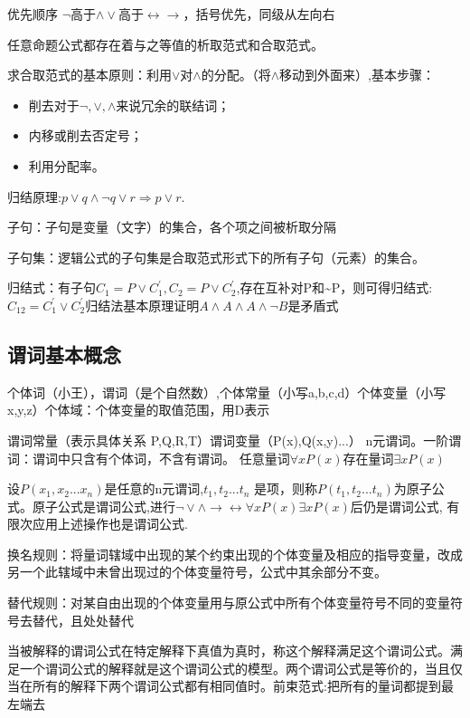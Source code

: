\documentclass[UTF8,a4paper,landscape,16pt]{paper}
\begin{document}
\begin{multicols}{4}
优先顺序 $\lnot$高于$\land\lor$高于$\leftrightarrow\rightarrow$，括号优先，同级从左向右

\noindent 任意命题公式都存在着与之等值的析取范式和合取范式。

\noindent 求合取范式的基本原则：利用$\lor$对$\land$的分配。（将$\land$移动到外面来）,基本步骤：
\begin{itemize}
\item 削去对于$\lnot,\lor,\land$来说冗余的联结词；
\item 内移或削去否定号；
\item 利用分配率。
\end{itemize}

\noindent 归结原理:$p \lor q\land\lnot q \lor r\Rightarrow p \lor r$.

\noindent 子句：子句是变量（文字）的集合，各个项之间被析取分隔

\noindent 子句集：逻辑公式的子句集是合取范式形式下的所有子句（元素）的集合。

\noindent 归结式：有子句$C_{1}=P\lor C_{1}^{'},C_{2}=P\lor C_{2}^{'}$,存在互补对P和\~{}P，则可得归结式:$C_{12}=C_{1}^{'}\lor C_{2}^{'}$归结法基本原理证明$A \land  A \land  A \land  \lnot B$是矛盾式

\subsection{谓词基本概念}
\noindent 个体词（小王），谓词（是个自然数）,个体常量（小写a,b,c,d）个体变量（小写x,y,z）个体域：个体变量的取值范围，用D表示

\noindent 谓词常量（表示具体关系 P,Q,R,T）谓词变量（P(x),Q(x,y)...） n元谓词。一阶谓词：谓词中只含有个体词，不含有谓词。
任意量词$\forall xP(x)$存在量词$\exists xP(x)$

\noindent 设$P(x_{1},x_{2}...x_{n})$是任意的n元谓词,$t_{1},t_{2}...t_{n}$ 是项，则称$P(t_{1},t_{2}...t_{n})$为原子公式。原子公式是谓词公式,进行$\lnot\lor\land\rightarrow\leftrightarrow\forall xP(x)\exists xP(x)$后仍是谓词公式, 有限次应用上述操作也是谓词公式.

\noindent 换名规则：将量词辖域中出现的某个约束出现的个体变量及相应的指导变量，改成另一个此辖域中未曾出现过的个体变量符号，公式中其余部分不变。

\noindent 替代规则：对某自由出现的个体变量用与原公式中所有个体变量符号不同的变量符号去替代，且处处替代

\noindent 当被解释的谓词公式在特定解释下真值为真时，称这个解释满足这个谓词公式。满足一个谓词公式的解释就是这个谓词公式的模型。两个谓词公式是等价的，当且仅当在所有的解释下两个谓词公式都有相同值时。前束范式:把所有的量词都提到最左端去


\end{multicols}
\end{document}
